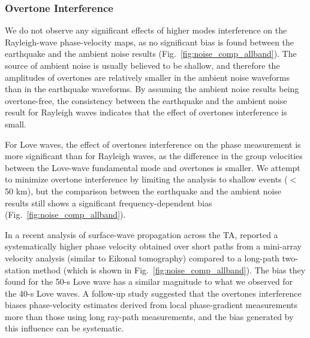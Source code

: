 



\subsubsection{Overtone Interference}
\label{sec:overtone}

We do not observe any significant effects of higher modes interference on the Rayleigh-wave phase-velocity maps, as no significant bias is found between the earthquake and the ambient noise results (Fig.~\ref{fig:noise_comp_allband}). The source of ambient noise is usually believed to be shallow, and therefore the amplitudes of overtones are relatively smaller in the ambient noise waveforms than in the earthquake waveforms. By assuming the ambient noise results being overtone-free, the consistency between the earthquake and the ambient noise result for Rayleigh waves indicates that the effect of overtones interference is small.

For Love waves, the effect of overtones interference on the phase measurement is more significant than for Rayleigh waves, as the difference in the group velocities between the Love-wave fundamental mode and overtones is smaller. We attempt to minimize overtone interference by limiting the analysis to shallow events ($<$50 km), but the comparison between the earthquake and the ambient noise results still shows a significant frequency-dependent bias (Fig.~\ref{fig:noise_comp_allband}).

In a recent analysis of surface-wave propagation across the TA, \citet{foster:2014kna} reported a systematically higher phase velocity obtained over short paths from a mini-array velocity analysis (similar to Eikonal tomography) compared to a long-path two-station method (which is shown in Fig.~\ref{fig:noise_comp_allband}). The bias they found for the 50-s Love wave has a similar magnitude to what we observed for the 40-s Love waves. A follow-up study \citep{Foster:2014kr} suggested that the overtones interference biases phase-velocity estimates derived from local phase-gradient measurements more than those using long ray-path measurements, and the bias generated by this influence can be systematic. 


